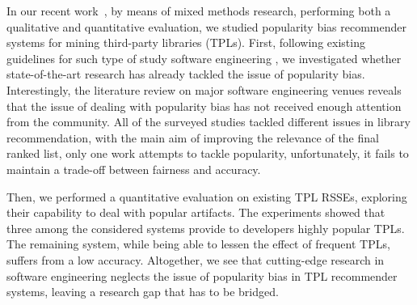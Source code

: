 In our recent work~\cite{10174041}, by means of mixed methods research, \ie performing both a qualitative and quantitative evaluation, we studied popularity bias recommender systems for mining third-party libraries (TPLs). %
First, following existing guidelines for such type of study software engineering \cite{KitchenhamBLBB11}, we investigated whether state-of-the-art research has already tackled the issue of popularity bias. %
Interestingly, the literature review on major software engineering venues reveals that the issue of dealing with popularity bias has not received enough attention from the community. All of the surveyed studies tackled different issues in library recommendation, with the main aim of improving the relevance of the final ranked list, %
only one work attempts to tackle popularity, unfortunately, it fails to maintain a trade-off between fairness and accuracy. %

Then, we performed a quantitative evaluation on \numSys existing TPL RSSEs, exploring their capability to deal with %
popular artifacts. %
The experiments showed that three among the considered systems provide to developers highly popular TPLs. The remaining system, while being able to lessen the effect of frequent TPLs, suffers from a low accuracy. Altogether, we see that cutting-edge research in software engineering neglects the issue of popularity bias in TPL recommender systems, leaving a research gap that has to be %
bridged.


